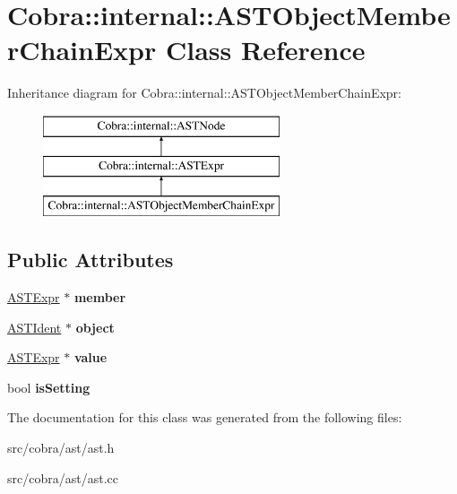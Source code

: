 \hypertarget{class_cobra_1_1internal_1_1_a_s_t_object_member_chain_expr}{\section{Cobra\+:\+:internal\+:\+:A\+S\+T\+Object\+Member\+Chain\+Expr Class Reference}
\label{class_cobra_1_1internal_1_1_a_s_t_object_member_chain_expr}
}
Inheritance diagram for Cobra\+:\+:internal\+:\+:A\+S\+T\+Object\+Member\+Chain\+Expr\+:\begin{figure}[H]
\begin{center}
\leavevmode
\includegraphics[height=3.000000cm]{class_cobra_1_1internal_1_1_a_s_t_object_member_chain_expr}
\end{center}
\end{figure}
\subsection*{Public Attributes}
\begin{DoxyCompactItemize}
\item 
\hypertarget{class_cobra_1_1internal_1_1_a_s_t_object_member_chain_expr_ab6a85fbf7191951c1de17a4208a637e7}{\hyperlink{class_cobra_1_1internal_1_1_a_s_t_expr}{A\+S\+T\+Expr} $\ast$ {\bfseries member}}\label{class_cobra_1_1internal_1_1_a_s_t_object_member_chain_expr_ab6a85fbf7191951c1de17a4208a637e7}

\item 
\hypertarget{class_cobra_1_1internal_1_1_a_s_t_object_member_chain_expr_a8661d1a44302fc804b54376b22b472e0}{\hyperlink{class_cobra_1_1internal_1_1_a_s_t_ident}{A\+S\+T\+Ident} $\ast$ {\bfseries object}}\label{class_cobra_1_1internal_1_1_a_s_t_object_member_chain_expr_a8661d1a44302fc804b54376b22b472e0}

\item 
\hypertarget{class_cobra_1_1internal_1_1_a_s_t_object_member_chain_expr_a1c21198f3672ed23e7458c1818525659}{\hyperlink{class_cobra_1_1internal_1_1_a_s_t_expr}{A\+S\+T\+Expr} $\ast$ {\bfseries value}}\label{class_cobra_1_1internal_1_1_a_s_t_object_member_chain_expr_a1c21198f3672ed23e7458c1818525659}

\item 
\hypertarget{class_cobra_1_1internal_1_1_a_s_t_object_member_chain_expr_a2c09e14e1007ea7f7e014944ef98a7c0}{bool {\bfseries is\+Setting}}\label{class_cobra_1_1internal_1_1_a_s_t_object_member_chain_expr_a2c09e14e1007ea7f7e014944ef98a7c0}

\end{DoxyCompactItemize}


The documentation for this class was generated from the following files\+:\begin{DoxyCompactItemize}
\item 
src/cobra/ast/ast.\+h\item 
src/cobra/ast/ast.\+cc\end{DoxyCompactItemize}
